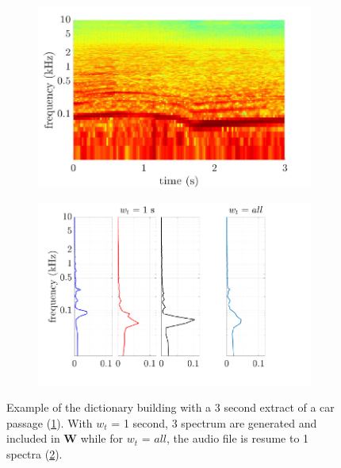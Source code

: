 \documentclass[twocolumn,a4paper,10pt]{article}
\begin{document}
\begin{figure}[t!]
    \centering
    \begin{subfigure}[t]{0.47\linewidth}
        \centering
       \includegraphics[width=\linewidth]{figures/dictionary1.pdf}
       \caption{}
        \label{fig:specW}
    \end{subfigure}%
    \hfill
    \begin{subfigure}[t]{0.47\linewidth}
        \centering
       \includegraphics[width=\linewidth]{figures/dictionary2.pdf}
        \caption{}
        \label{fig:ElementW}
    \end{subfigure}
    \caption{Example of the dictionary building with a 3 second extract of a car passage (\ref{fig:specW}). With $w_t$ = 1 second, 3 spectrum are generated and included in $\mathbf{W}$ while for $w_t$ = $all$, the audio file is resume to 1 spectra (\ref{fig:ElementW}).}
    \label{fig:spec_elementW}
\end{figure}
\end{document}
